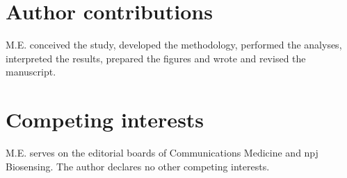 \documentclass[11pt]{article}
\begin{document}
\section*{Author contributions}
M.E. conceived the study, developed the methodology, performed the analyses, interpreted the results, prepared the figures and wrote and revised the manuscript.
\section*{Competing interests}
M.E. serves on the editorial boards of Communications Medicine and npj Biosensing. The author declares no other competing interests.
\begingroup\footnotesize\setlength{\bibsep}{1pt}\endgroup
\end{document}
